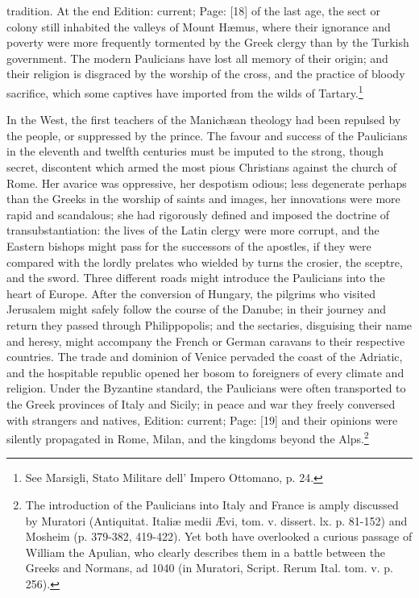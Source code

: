 tradition. At the end Edition: current; Page: [18] of the last age, the sect or colony still inhabited the valleys of Mount Hæmus, where their ignorance and poverty were more frequently tormented by the Greek clergy than by the Turkish government. The modern Paulicians have lost all memory of their origin; and their religion is disgraced by the worship of the cross, and the practice of bloody sacrifice, which some captives have imported from the wilds of Tartary.\footnote{See Marsigli, Stato Militare dell\texthebrew{}’ Impero Ottomano, p. 24.}

In the West, the first teachers of the Manichæan theology had been repulsed by the people, or suppressed by the prince. The favour and success of the Paulicians in the eleventh and twelfth centuries must be imputed to the strong, though secret, discontent which armed the most pious Christians against the church of Rome. Her avarice was oppressive, her despotism odious; less degenerate perhaps than the Greeks in the worship of saints and images, her innovations were more rapid and scandalous; she had rigorously defined and imposed the doctrine of transubstantiation: the lives of the Latin clergy were more corrupt, and the Eastern bishops might pass for the successors of the apostles, if they were compared with the lordly prelates who wielded by turns the crosier, the sceptre, and the sword. Three different roads might introduce the Paulicians into the heart of Europe. After the conversion of Hungary, the pilgrims who visited Jerusalem might safely follow the course of the Danube; in their journey and return they passed through Philippopolis; and the sectaries, disguising their name and heresy, might accompany the French or German caravans to their respective countries. The trade and dominion of Venice pervaded the coast of the Adriatic, and the hospitable republic opened her bosom to foreigners of every climate and religion. Under the Byzantine standard, the Paulicians were often transported to the Greek provinces of Italy and Sicily; in peace and war they freely conversed with strangers and natives, Edition: current; Page: [19] and their opinions were silently propagated in Rome, Milan, and the kingdoms beyond the Alps.\footnote{The introduction of the Paulicians into Italy and France is amply discussed by Muratori (Antiquitat. Italiæ medii Ævi, tom. v. dissert. lx. p. 81-152) and Mosheim (p. 379-382, 419-422). Yet both have overlooked a curious passage of William the Apulian, who clearly describes them in a battle between the Greeks and Normans, ad 1040 (in Muratori, Script. Rerum Ital. tom. v. p. 256).

}
